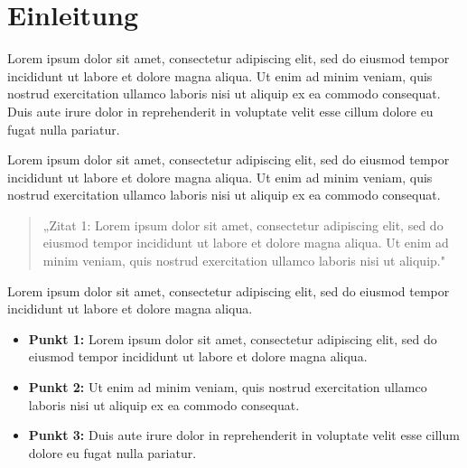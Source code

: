 
\section{Einleitung}
\label{sec:einleitung}

Lorem ipsum dolor sit amet, consectetur adipiscing elit, sed do eiusmod tempor
incididunt ut labore et dolore magna aliqua. Ut enim ad minim veniam, quis nostrud
exercitation ullamco laboris nisi ut aliquip ex ea commodo consequat. Duis aute
irure dolor in reprehenderit in voluptate velit esse cillum dolore eu fugat nulla
pariatur.\autocite[Vgl.][S. 1]{muster:buch:2023}

Lorem ipsum dolor sit amet, consectetur adipiscing elit, sed do eiusmod tempor
incididunt ut labore et dolore magna aliqua. Ut enim ad minim veniam, quis nostrud
exercitation ullamco laboris nisi ut aliquip ex ea commodo consequat.\autocite[Vgl.][S. 100]{muster:artikel:2022}


\begin{quotation}
	„Zitat 1: Lorem ipsum dolor sit amet, consectetur adipiscing elit, sed do
	eiusmod tempor incididunt ut labore et dolore magna aliqua. Ut enim ad minim
	veniam, quis nostrud exercitation ullamco laboris nisi ut aliquip."\autocite[][S. 55]{muster:kapitel:2021}
\end{quotation}

Lorem ipsum dolor sit amet, consectetur adipiscing elit, sed do eiusmod tempor
incididunt ut labore et dolore magna aliqua.

\begin{itemize}
	\item \textbf{Punkt 1:} Lorem ipsum dolor sit amet, consectetur adipiscing
		elit, sed do eiusmod tempor incididunt ut labore et dolore magna aliqua.
	\item \textbf{Punkt 2:} Ut enim ad minim veniam, quis nostrud exercitation
		ullamco laboris nisi ut aliquip ex ea commodo consequat.
	\item \textbf{Punkt 3:} Duis aute irure dolor in reprehenderit in voluptate
		velit esse cillum dolore eu fugat nulla pariatur.
\end{itemize}


